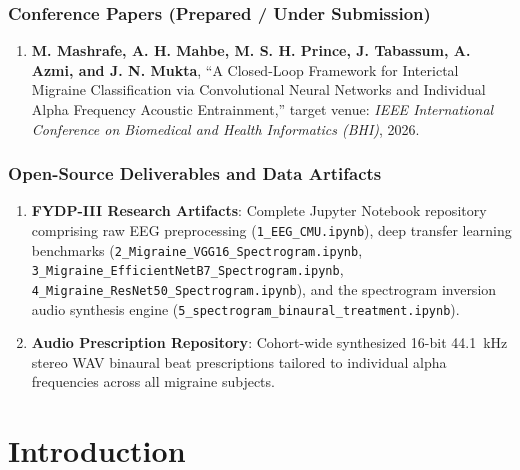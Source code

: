 \documentclass[12pt, a4paper]{report}
\begin{document}
\subsection*{Conference Papers (Prepared / Under Submission)}
\begin{enumerate}
    \item \textbf{M. Mashrafe, A. H. Mahbe, M. S. H. Prince, J. Tabassum, A. Azmi, and J. N. Mukta}, ``A Closed-Loop Framework for Interictal Migraine Classification via Convolutional Neural Networks and Individual Alpha Frequency Acoustic Entrainment,'' target venue: \textit{IEEE International Conference on Biomedical and Health Informatics (BHI)}, 2026.
\end{enumerate}

\subsection*{Open-Source Deliverables and Data Artifacts}
\begin{enumerate}
    \item \textbf{FYDP-III Research Artifacts}: Complete Jupyter Notebook repository comprising raw EEG preprocessing (\texttt{1\_EEG\_CMU.ipynb}), deep transfer learning benchmarks (\texttt{2\_Migraine\_VGG16\_Spectrogram.ipynb}, \texttt{3\_Migraine\_EfficientNetB7\_Spectrogram.ipynb}, \texttt{4\_Migraine\_ResNet50\_Spectrogram.ipynb}), and the spectrogram inversion audio synthesis engine (\texttt{5\_spectrogram\_binaural\_treatment.ipynb}).
    \item \textbf{Audio Prescription Repository}: Cohort-wide synthesized 16-bit 44.1~kHz stereo WAV binaural beat prescriptions tailored to individual alpha frequencies across all migraine subjects.
\end{enumerate}

\newpage

\tableofcontents
\newpage

\listoffigures
{}
\newpage

\listoftables
{}
\newpage

\chapter{Introduction}
\label{ch:introduction}
\end{document}
